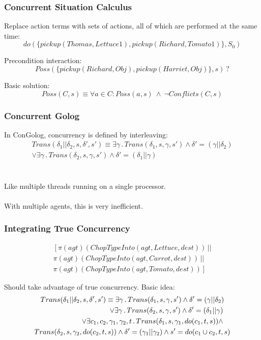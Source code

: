 \documentclass[compress]{beamer}
\begin{document}
\begin{frame}
\frametitle{Concurrent Situation Calculus}
Replace action terms with sets of actions, all of which are performed
at the same time:\[
do(\{pickup(Thomas,Lettuce1),pickup(Richard,Tomato1)\},S_0)\]

Precondition interaction:\[
Poss(\{pickup(Richard,Obj),pickup(Harriet,Obj)\},s)\ ?\]

Basic solution:\[
Poss(C,s) \equiv \forall a \in C: Poss(a,s)\ \wedge\ \neg Conflicts(C,s)\]
\end{frame}

\begin{frame}
\frametitle{Concurrent Golog}
In ConGolog, concurrency is defined by interleaving:
\begin{multline*}
Trans(\delta_{1}||\delta_{2},s,\delta',s')\equiv\exists\gamma\,.\, Trans(\delta_{1},s,\gamma,s')\wedge\delta'=(\gamma||\delta_{2})\\
\vee\exists\gamma\,.\, Trans(\delta_{2},s,\gamma,s')\wedge\delta'=(\delta_{1}||\gamma)
\end{multline*}
\ \\
\ \\
Like multiple threads running on a single processor. \\
\ \\
With multiple agents, this is very inefficient.
\end{frame}

\begin{frame}
\frametitle{Integrating True Concurrency}
\begin{multline*}
\left[\pi(agt)(ChopTypeInto(agt,Lettuce,dest))\,||\right.\\
\pi(agt)(ChopTypeInto(agt,Carrot,dest))\,||\\
\left.\pi(agt)(ChopTypeInto(agt,Tomato,dest))\right]
\end{multline*}

Should take advantage of true concurrency.  Basic idea:
\begin{multline*}
Trans(\delta_{1}||\delta_{2},s,\delta',s')\equiv\exists\gamma\,.\, Trans(\delta_{1},s,\gamma,s')\wedge\delta'=(\gamma||\delta_{2})\\
\shoveright{\vee\exists\gamma\,.\, Trans(\delta_{2},s,\gamma,s')\wedge\delta'=(\delta_{1}||\gamma)}\\
\shoveright{\vee\exists c_{1},c_{2},\gamma_{1},\gamma_{2},t\,.\, Trans(\delta_{1},s,\gamma_{1},do(c_{1},t,s))\wedge}\\ 
Trans(\delta_{2},s,\gamma_{2},do(c_{2},t,s))\wedge\delta'=(\gamma_{1}||\gamma_{2})\wedge s'=do(c_{1}\cup c_{2},t,s)
\end{multline*}
\end{frame}
\end{document}
